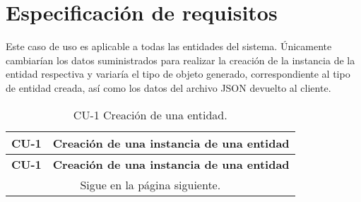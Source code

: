 \newpage
\section{Especificación de requisitos}

Este caso de uso es aplicable a todas las entidades del sistema. Únicamente cambiarían los datos suministrados para realizar la creación de la instancia de la entidad respectiva y variaría el tipo de objeto generado, correspondiente al tipo de entidad creada, así como los datos del archivo JSON devuelto al cliente.

\begin{longtable}{ p{} p{} }
    \caption{CU-1 Creación de una entidad.}\\
    \hline
    \textbf{CU-1}    & \textbf{Creación de una instancia de una entidad}\\
    \hline
    \endfirsthead
    \hline
    \textbf{CU-1}    & \textbf{Creación de una instancia de una entidad}\\
    \hline
    \endhead
    \hline
    \multicolumn{2}{c}{Sigue en la página siguiente.}
    \endfoot
    \hline
    \endlastfoot


\end{longtable}
